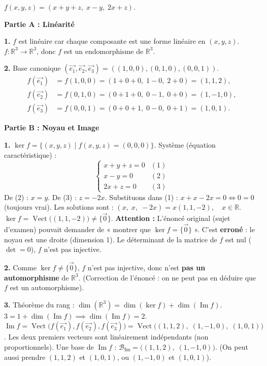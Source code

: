 \documentclass[11pt]{article}
\newcommand{\cle}[1]{{\popxbold\color{popdark}#1}}
\begin{document}
\begin{corrige}
$f(x,y,z)=(x+y+z,\;x-y,\;2x+z)$.

\textbf{Partie A : Linéarité}

\textbf{1.} $f$ est linéaire car chaque composante est une forme linéaire en $(x,y,z)$.
$f:\mathbb{R}^3\to\mathbb{R}^3$, donc $f$ est un \cle{endomorphisme} de $\mathbb{R}^3$.

\textbf{2.} Base canonique $(\vec{e_1},\vec{e_2},\vec{e_3}) = ((1,0,0),(0,1,0),(0,0,1))$.
\begin{align*}
f(\vec{e_1}) &= f(1,0,0) = (1+0+0,\;1-0,\;2+0) = \boxed{(1,1,2)}, \\
f(\vec{e_2}) &= f(0,1,0) = (0+1+0,\;0-1,\;0+0) = \boxed{(1,-1,0)}, \\
f(\vec{e_3}) &= f(0,0,1) = (0+0+1,\;0-0,\;0+1) = \boxed{(1,0,1)}.
\end{align*}

\vspace{0.5em}
\textbf{Partie B : Noyau et Image}

\textbf{1.} $\ker f = \{(x,y,z)\mid f(x,y,z)=(0,0,0)\}$.
Système (équation caractéristique) :
\[ \begin{cases} x + y + z = 0 & (1) \\ x - y = 0 & (2) \\ 2x + z = 0 & (3) \end{cases} \]
De (2) : $x=y$.
De (3) : $z = -2x$.
Substituons dans (1) : $x + x - 2x = 0 \iff 0=0$ (toujours vrai).
Les solutions sont : $(x,\;x,\;-2x) = x(1,1,-2),\quad x\in\mathbb{R}$.
$\ker f = \operatorname{Vect}\big((1,1,-2)\big) \neq \{\vec{0}\}$.
\textbf{Attention :} L'énoncé original (sujet d'examen) pouvait demander de « montrer que $\ker f=\{\vec{0}\}$ ». C'est \textbf{erroné} : le noyau est une droite (dimension 1). Le déterminant de la matrice de $f$ est nul ($\det=0$), $f$ n'est pas injective.

\textbf{2.} Comme $\ker f \neq \{\vec{0}\}$, $f$ n'est pas injective, donc n'est \textbf{pas un automorphisme} de $\mathbb{R}^3$.
(Correction de l'énoncé : on ne peut pas en déduire que $f$ est un automorphisme).

\textbf{3.} \cle{Théorème du rang} : $\dim(\mathbb{R}^3) = \dim(\ker f) + \dim(\operatorname{Im} f)$.
$3 = 1 + \dim(\operatorname{Im} f) \implies \dim(\operatorname{Im} f) = 2$.
$\operatorname{Im} f = \operatorname{Vect}\big(f(\vec{e_1}), f(\vec{e_2}), f(\vec{e_3})\big) = \operatorname{Vect}\big((1,1,2),\;(1,-1,0),\;(1,0,1)\big)$.
Les deux premiers vecteurs sont linéairement indépendants (non proportionnels).
Une base de $\operatorname{Im} f$ : $\boxed{\mathcal{B}_{\operatorname{Im}} = \big((1,1,2),\;(1,-1,0)\big)}$.
(On peut aussi prendre $(1,1,2)$ et $(1,0,1)$, ou $(1,-1,0)$ et $(1,0,1)$).


\end{corrige}
\end{document}
